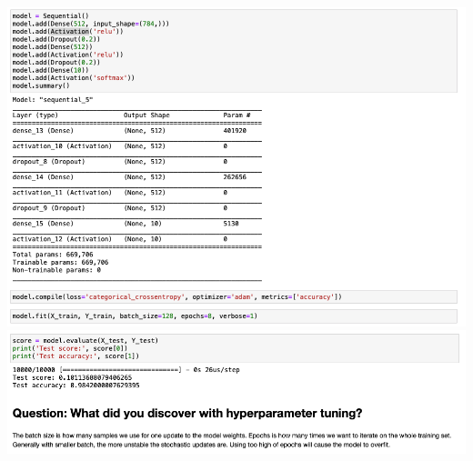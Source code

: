 \documentclass[11pt]{article}
\begin{document}
\includegraphics[scale= 0.35]{hw8-21} \\
\includegraphics[scale= 0.35]{hw8-22} \\
\end{document}
